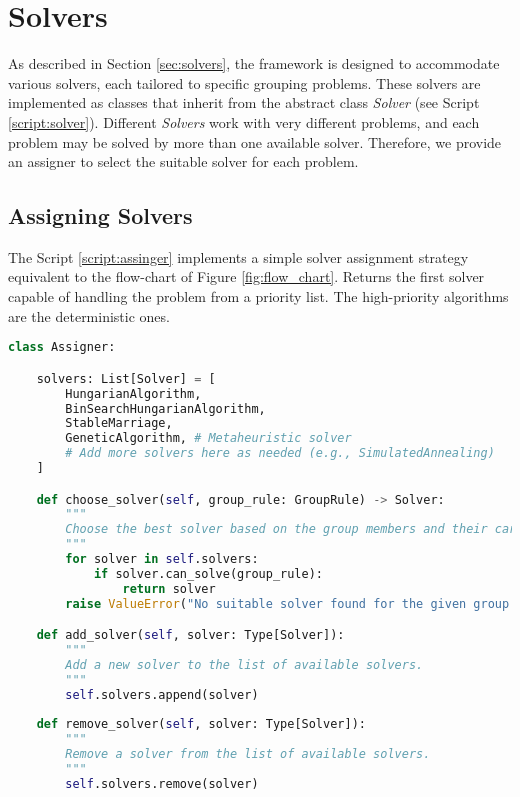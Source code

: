     \section{Solvers}
        As described in Section \ref{sec:solvers}, the framework is designed to accommodate various solvers, each tailored to specific grouping problems. These solvers are implemented as classes that inherit from the abstract class \textit{Solver} (see Script \ref{script:solver}).
        Different \textit{Solvers} work with very different problems, and each problem may be solved by more than one available solver.
        Therefore, we provide an assigner to select the suitable solver for each problem.

        \subsection{Assigning Solvers}
            The Script \ref{script:assinger} implements a simple solver assignment strategy equivalent to the flow-chart of Figure \ref{fig:flow_chart}.
            Returns the first solver capable of handling the problem from a priority list.
            The high-priority algorithms are the deterministic ones.
            
    \begin{lstlisting}[language=Python, caption={Assigner Class.}, label={script:assinger}]
class Assigner:

    solvers: List[Solver] = [
        HungarianAlgorithm,
        BinSearchHungarianAlgorithm,
        StableMarriage,
        GeneticAlgorithm, # Metaheuristic solver
        # Add more solvers here as needed (e.g., SimulatedAnnealing)
    ]

    def choose_solver(self, group_rule: GroupRule) -> Solver:
        """
        Choose the best solver based on the group members and their cardinality.
        """
        for solver in self.solvers:
            if solver.can_solve(group_rule):
                return solver
        raise ValueError("No suitable solver found for the given group.")

    def add_solver(self, solver: Type[Solver]):
        """
        Add a new solver to the list of available solvers.
        """
        self.solvers.append(solver)
    
    def remove_solver(self, solver: Type[Solver]):
        """
        Remove a solver from the list of available solvers.
        """
        self.solvers.remove(solver)
\end{lstlisting}


